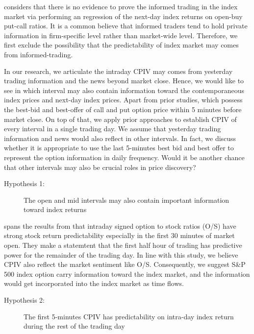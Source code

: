 
\textcite{pan2006information} considers that there is no evidence to prove the informed trading in the index market via performing an regression of the next-day index returns on open-buy put-call ratios. It is a common believe that informed traders tend to hold private information in firm-specific level rather than market-wide level. Therefore, we first exclude the possibility that the predictability of index market may comes from informed-trading. 

In our research, we articulate the intraday CPIV may comes from yesterday trading information and the news beyond market close. Hence, we would like to see in which interval may also contain information toward the contemporaneous index prices and next-day index prices. Apart from prior studies, which possess the best-bid and best-offer of call and put option price within 5 minutes before market close. On top of that, we apply prior approaches to establish CPIV of every interval in a single trading day. We assume that yesterday trading information and news would also reflect in other intervals. In fact, we discuss whether it is appropriate to use the last 5-minutes best bid and best offer to represent the option information in daily frequency. Would it be another chance that other intervals may also be crucial roles in price discovery?  

\begin{description}
\item[Hypothesis 1:] The open and mid intervals may also contain important information toward index returns
\end{description}


\textcite{bergsma2018intraday} spans the results from \textcite{easley1998option} that intraday signed option to stock ratios (O/S) have strong stock return predictability especially in the first 30 minutes of market open. They make a statemtent that the first half hour of trading has predictive power for the remainder of the trading day. In line with this study, we believe CPIV also reflect the market sentiment like O/S. Consequently, we suggest S\&P 500 index option carry information toward the index market, and the information would get incorporated into the index market as time flows. 

\begin{description} 
\item[Hypothesis 2:] The first 5-minutes CPIV has predictability on intra-day index return during the rest of the trading day
\end{description}




